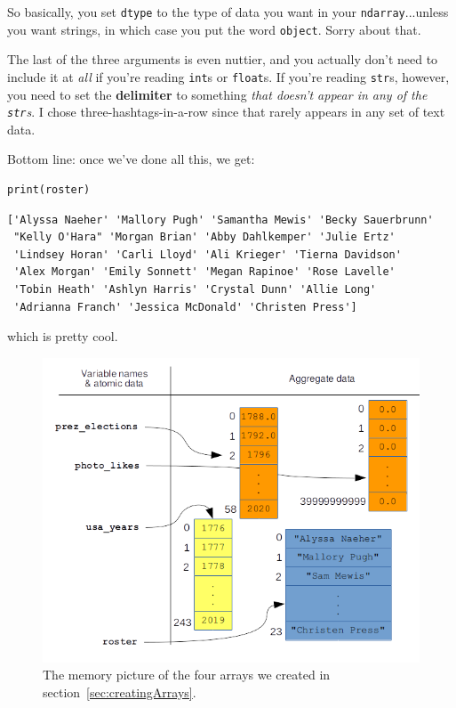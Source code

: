 So basically, you set \texttt{dtype} to the type of data you want in your
\texttt{ndarray}...unless you want strings, in which case you put the word
\texttt{object}. Sorry about that.


The last of the three arguments is even nuttier, and you actually don't need to
include it at \textit{all} if you're reading \texttt{int}s or \texttt{float}s.
If you're reading \texttt{str}s, however, you need to set the
\textbf{delimiter} to something \textit{that doesn't appear in any of the
\texttt{str}s}. I chose three-hashtags-in-a-row since that rarely appears in
any set of text data.

Bottom line: once we've done all this, we get:

\begin{Verbatim}[fontsize=\small,samepage=true,frame=single,framesep=3mm]
print(roster)
\end{Verbatim}

\label{rosterNames}
\begin{Verbatim}[fontsize=\small,samepage=true,frame=leftline,framesep=5mm,framerule=1mm]
['Alyssa Naeher' 'Mallory Pugh' 'Samantha Mewis' 'Becky Sauerbrunn'
 "Kelly O'Hara" 'Morgan Brian' 'Abby Dahlkemper' 'Julie Ertz'
 'Lindsey Horan' 'Carli Lloyd' 'Ali Krieger' 'Tierna Davidson'
 'Alex Morgan' 'Emily Sonnett' 'Megan Rapinoe' 'Rose Lavelle'
 'Tobin Heath' 'Ashlyn Harris' 'Crystal Dunn' 'Allie Long'
 'Adrianna Franch' 'Jessica McDonald' 'Christen Press']
\end{Verbatim}

which is pretty cool.

\begin{figure}[ht]
\centering
\includegraphics[width=1\textwidth]{arraysInMemory.png}
\caption{The memory picture of the four arrays we created in
section~\ref{sec:creatingArrays}.}
\label{fig:arraysInMemory}
\end{figure}
